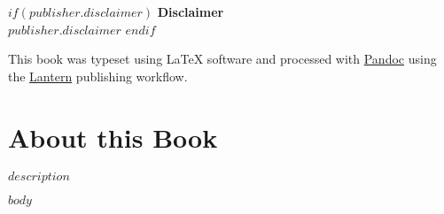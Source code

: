 \documentclass{book}
\begin{document}
\begin{flushleft}
\begin{description}
\end{description}

$if(publisher.disclaimer)$
\textbf{Disclaimer} \\
  $publisher.disclaimer$
$endif$

\vspace*{\fill}

This book was typeset using \LaTeX{} software and processed with \href{https://pandoc.org}{Pandoc} using the \href{http://lantern.northwestern.pub}{Lantern} publishing workflow.\\

\end{flushleft}

\addtocounter{page}{2}

\chapter*{About this Book}
$description$

\setcounter{tocdepth}{3}
\tableofcontents

\mainmatter

$body$

\backmatter
\end{document}
